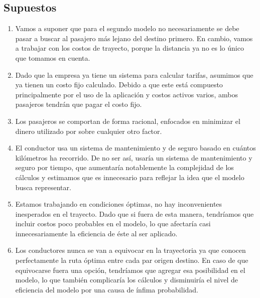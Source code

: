 \documentclass[12pt]{report}
\begin{document}
\subsection*{Supuestos}
\begin{enumerate}
    \item Vamos a suponer que para el segundo modelo no necesariamente se debe pasar a buscar al pasajero más lejano del destino primero. En cambio, vamos a trabajar con los costos de trayecto, porque la distancia ya no es lo único que tomamos en cuenta.
    \item Dado que la empresa ya tiene un sistema para calcular tarifas, asumimos que ya tienen un costo fijo calculado. Debido a que este está compuesto principalmente por el uso de la aplicación y costos activos varios, ambos pasajeros tendrán que pagar el costo fijo.
    \item Los pasajeros se comportan de forma racional, enfocados en minimizar el dinero utilizado por sobre cualquier otro factor. 
    \item El conductor usa un sistema de mantenimiento y de seguro basado en cuántos kilómetros ha recorrido. De no ser así, usaría un sistema de mantenimiento y seguro por tiempo, que aumentaría notablemente la complejidad de los cálculos y estimamos que es innecesario para reflejar la idea que el modelo busca representar.
    \item Estamos trabajando en condiciones óptimas, no hay inconvenientes inesperados en el trayecto. Dado que si fuera de esta manera, tendríamos que incluir costos poco probables en el modelo, lo que afectaría casi innecesariamente la eficiencia de éste al ser aplicado.
    \item Los conductores nunca se van a equivocar en la trayectoria ya que conocen perfectamente la ruta óptima entre cada par origen destino. En caso de que equivocarse fuera una opción, tendríamos que agregar esa posibilidad en el modelo, lo que también complicaría los cálculos y disminuiría el nivel de eficiencia del modelo por una causa de ínfima probabilidad.
\end{enumerate}
\end{document}
